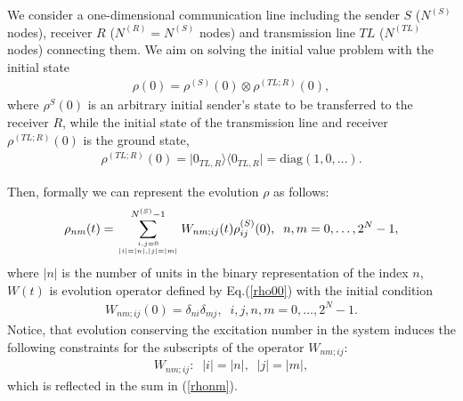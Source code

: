 \documentclass[pra,preprint,showpacs]{revtex4-1}
\begin{document}
We consider a one-dimensional communication line including the sender $S$ {($N^{(S)}$ nodes)}, receiver $R$ {($N^{(R)}=N^{(S)}$ nodes)} and transmission line $TL$  {($N^{(TL)}$ nodes)} connecting them.
We aim on solving the initial value problem with the
initial state
\begin{eqnarray}\label{rho0}
\rho(0)=\rho^{(S)}(0)\otimes \rho^{(TL;R)}(0),
\end{eqnarray}
where $\rho^S(0)$ is an arbitrary  initial sender's state to be transferred to the receiver $R$, while the initial state of the transmission line and receiver $\rho^{(TL;R)}(0)$ is the ground state,
\begin{eqnarray}
\rho^{(TL;R)}(0) = |0_{TL,R}\rangle
{\langle 0_{TL,R}|} = {\mbox{diag}}(1,0,\dots).
\end{eqnarray}

Then, formally we can represent the evolution $\rho$ as follows:
\begin{eqnarray}\label{rhonm}
\rho_{nm}(t)=\sum_{{i,j=0}\atop{|i|=|n|, |j|=|m|} }^{N^{(S)}-1} W_{nm;ij}(t)\rho_{ij}^{(S)}(0) ,\;\;n,m=0,\dots,2^N-1,
\end{eqnarray}
where $|n|$ is the number of units in the binary representation of the index $n$,
 $W(t)$ is  evolution operator defined  by Eq.(\ref{rho00})
with the initial condition
\begin{eqnarray}\label{ic}
W_{nm;ij}(0) =
 \delta_{ni}\delta_{mj},\;\;i,j,n,m=0,\dots,2^{N}-1.
\end{eqnarray}
Notice, that evolution conserving the excitation number in the system induces the following constraints  for the subscripts of the  operator $W_{nm;ij}$:
\begin{eqnarray}
W_{nm;ij}: \;\;|i|=|n|,\;\;|j| = |m|,
\end{eqnarray}
which is reflected in the sum in  (\ref{rhonm}).
\end{document}
